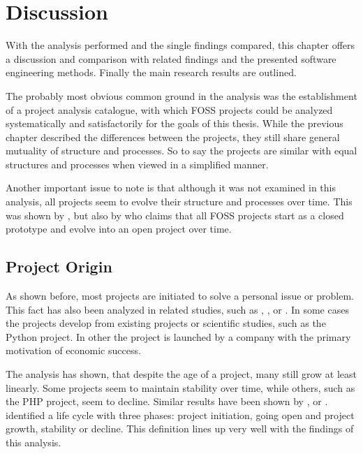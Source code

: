 \chapter{Discussion} %
\label{chap:discussion}

With the analysis performed and the single findings compared, this chapter
offers a discussion and comparison with related findings and the presented
software engineering methods. Finally the main research results are outlined.

The probably most obvious common ground in the analysis was the establishment
of a project analysis catalogue, with which \ac{FOSS} projects could be
analyzed systematically and satisfactorily for the goals of this thesis. While
the previous chapter described the differences between the projects, they still
share general mutuality of structure and processes. So to say the projects are
similar with equal structures and processes when viewed in a simplified manner.

Another important issue to note is that although it was not examined in this
analysis, all projects seem to evolve their structure and processes over time.
This was shown by \textcite{Scacchi2006}, \textcite{Godfrey2000} but also by
\textcite{Johnson2001} who claims that all \ac{FOSS} projects start as a closed
prototype and evolve into an open project over time.

\section{Project Origin} %

As shown before, most projects are initiated to solve a personal issue or
problem. This fact has also been analyzed in related studies, such as
\textcite{Raymond1998}, \textcite{Lakhani2003}, \textcite{Hertel2003} or
\textcite{Johnson2001}. In some cases the projects develop from existing
projects or scientific studies, such as the Python project. In other the
project is launched by a company with the primary motivation of economic
success.

The analysis has shown, that despite the age of a project, many still grow at
least linearly. Some projects seem to maintain stability over time, while
others, such as the PHP project, seem to decline. Similar results have been
shown by \textcite{Godfrey2000}, \textcite{Roets2007} or \textcite{Ogawa2007}.
\textcite{Schweik2003} identified a life cycle with three phases: project
initiation, going open and project growth, stability or decline. This
definition lines up very well with the findings of this analysis.

